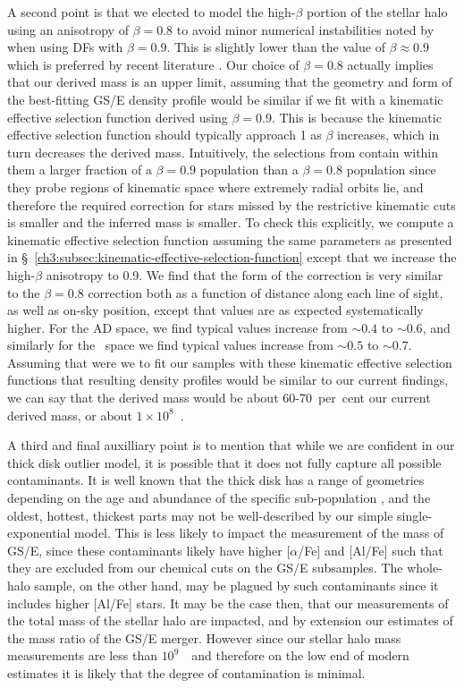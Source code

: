 A second point is that we elected to model the high-$\beta$ portion of the stellar halo using an anisotropy of $\beta=0.8$ to avoid minor numerical instabilities noted by \cite{lane22} when using DFs with $\beta=0.9$. This is slightly lower than the value of $\beta \approx 0.9$ which is preferred by recent literature \parencite{belokurov18,fattahi19,lancaster19,iorio21}. Our choice of $\beta=0.8$ actually implies that our derived mass is an upper limit, assuming that the geometry and form of the best-fitting GS/E density profile would be similar if we fit with a kinematic effective selection function derived using $\beta=0.9$. This is because the kinematic effective selection function should typically approach 1 as $\beta$ increases, which in turn decreases the derived mass. Intuitively, the selections from \cite{lane22} contain within them a larger fraction of a $\beta=0.9$ population than a $\beta=0.8$ population since they probe regions of kinematic space where extremely radial orbits lie, and therefore the required correction for stars missed by the restrictive kinematic cuts is smaller and the inferred mass is smaller. To check this explicitly, we compute a kinematic effective selection function assuming the same parameters as presented in \S~\ref{ch3:subsec:kinematic-effective-selection-function} except that we increase the high-$\beta$ anisotropy to 0.9. We find that the form of the correction is very similar to the $\beta=0.8$ correction both as a function of distance along each line of sight, as well as on-sky position, except that values are as expected systematically higher. For the AD space, we find typical values increase from $\sim 0.4$ to $\sim 0.6$, and similarly for the \eLz\ space we find typical values increase from $\sim 0.5$ to $\sim 0.7$. Assuming that were we to fit our samples with these kinematic effective selection functions that resulting density profiles would be similar to our current findings, we can say that the derived mass would be about 60-70~per~cent our current derived mass, or about $1\times10^{8}$~\Msun.

A third and final auxilliary point is to mention that while we are confident in our thick disk outlier model, it is possible that it does not fully capture all possible contaminants. It is well known that the thick disk has a range of geometries depending on the age and abundance of the specific sub-population \parencite{bovy12d,mackereth19b}, and the oldest, hottest, thickest parts may not be well-described by our simple single-exponential model. This is less likely to impact the measurement of the mass of GS/E, since these contaminants likely have higher [$\alpha$/Fe] and [Al/Fe] such that they are excluded from our chemical cuts on the GS/E subsamples. The whole-halo sample, on the other hand, may be plagued by such contaminants since it includes higher [Al/Fe] stars. It may be the case then, that our measurements of the total mass of the stellar halo are impacted, and by extension our estimates of the mass ratio of the GS/E merger. However since our stellar halo mass measurements are less than $10^{9}$~\Msun\ and therefore on the low end of modern estimates \parencite[e.g.][]{deason19,mackereth20} it is likely that the degree of contamination is minimal.


